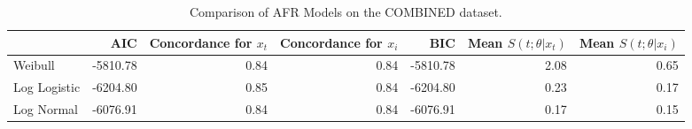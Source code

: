 \begin{table}
\caption{Comparison of AFR Models on the COMBINED dataset.}
\label{tab:Combined}
\begin{tabular}{lrrrrrr}
\toprule
 & AIC & Concordance for $x_t$ & Concordance for $x_i$ & BIC & Mean $S(t;\theta|x_{t})$ & Mean $S(t;\theta|x_{i})$ \\
\midrule
Weibull & -5810.78 & 0.84 & 0.84 & -5810.78 & 2.08 & 0.65 \\
Log Logistic & -6204.80 & 0.85 & 0.84 & -6204.80 & 0.23 & 0.17 \\
Log Normal & -6076.91 & 0.84 & 0.84 & -6076.91 & 0.17 & 0.15 \\
\bottomrule
\end{tabular}
\end{table}
